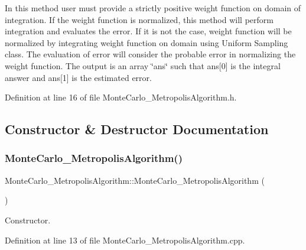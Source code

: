In this method user must provide a strictly positive weight function on domain of integration. If the weight function is normalized, this method will perform integration and evaluates the error. If it is not the case, weight function will be normalized by integrating weight function on domain using Uniform Sampling class. The evaluation of error will consider the probable error in normalizing the weight function. The output is an array \char`\"{}ans\char`\"{} such that ans\mbox{[}0\mbox{]} is the integral answer and ans\mbox{[}1\mbox{]} is the estimated error. 

Definition at line 16 of file Monte\+Carlo\+\_\+\+Metropolis\+Algorithm.\+h.



\subsection{Constructor \& Destructor Documentation}
\mbox{\label{class_monte_carlo___metropolis_algorithm_a80995ad029b056ca675c751c247426a5}} 
\subsubsection{\texorpdfstring{Monte\+Carlo\+\_\+\+Metropolis\+Algorithm()}{MonteCarlo\_MetropolisAlgorithm()}}
{\footnotesize\ttfamily Monte\+Carlo\+\_\+\+Metropolis\+Algorithm\+::\+Monte\+Carlo\+\_\+\+Metropolis\+Algorithm (\begin{DoxyParamCaption}{ }\end{DoxyParamCaption})}



Constructor. 



Definition at line 13 of file Monte\+Carlo\+\_\+\+Metropolis\+Algorithm.\+cpp.

\mbox{\label{class_monte_carlo___metropolis_algorithm_aecedd40f8c0098bc66d455ef06814981}} 
